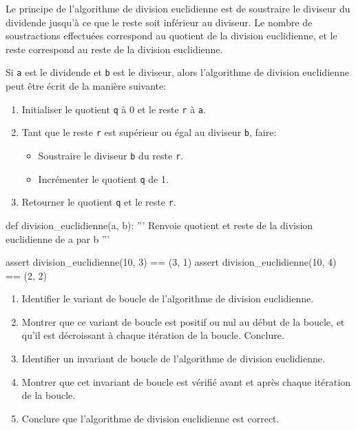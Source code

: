 \pagebreak

\begin{exercice_cours}{}

	Le principe de l'algorithme de division euclidienne est de soustraire le diviseur du dividende jusqu'à ce que le reste soit inférieur au diviseur. Le nombre de soustractions effectuées correspond au quotient de la division euclidienne, et le reste correspond au reste de la division euclidienne.

	Si \texttt{a} est le dividende et \texttt{b} est le diviseur, alors l'algorithme de division euclidienne peut être écrit de la manière suivante:
	\begin{enumerate}
		\item Initialiser le quotient \texttt{q} à 0 et le reste \texttt{r} à \texttt{a}.
		\item Tant que le reste \texttt{r} est supérieur ou égal au diviseur \texttt{b}, faire:
		\begin{itemize}
			\item Soustraire le diviseur \texttt{b} du reste \texttt{r}.
			\item Incrémenter le quotient \texttt{q} de 1.
		\end{itemize}
		\item Retourner le quotient \texttt{q} et le reste \texttt{r}.
	\end{enumerate}

	\begin{CodePythontexAlt}[Largeur=1\linewidth,Centre,PremLigne=1, Lignes=false]{}
		def division_euclidienne(a, b):
			''' Renvoie quotient et reste de la division euclidienne de a par b '''
			






			



		assert division_euclidienne(10, 3) == (3, 1)	
		assert division_euclidienne(10, 4) == (2, 2)
		\end{CodePythontexAlt}
		\begin{enumerate}
			\item Identifier le variant de boucle de l'algorithme de division euclidienne.
			\item Montrer que ce variant de boucle est positif ou nul au début de la boucle, et qu'il est décroissant à chaque itération de la boucle. Conclure.
			\item Identifier un invariant de boucle de l'algorithme de division euclidienne.
			\item Montrer que cet invariant de boucle est vérifié avant et après chaque itération de la boucle.
			\item Conclure que l'algorithme de division euclidienne est correct.
		\end{enumerate}
\end{exercice_cours}


